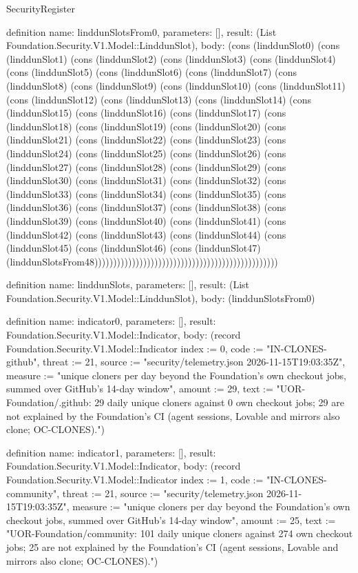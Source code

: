 \begin{lexlean}{SecurityRegister}
\begin{semanticmodule}
definition{
  name: linddunSlotsFrom0,
  parameters: [],
  result: (List Foundation.Security.V1.Model::LinddunSlot),
  body: (cons (linddunSlot0) (cons (linddunSlot1) (cons (linddunSlot2) (cons (linddunSlot3) (cons (linddunSlot4) (cons (linddunSlot5) (cons (linddunSlot6) (cons (linddunSlot7) (cons (linddunSlot8) (cons (linddunSlot9) (cons (linddunSlot10) (cons (linddunSlot11) (cons (linddunSlot12) (cons (linddunSlot13) (cons (linddunSlot14) (cons (linddunSlot15) (cons (linddunSlot16) (cons (linddunSlot17) (cons (linddunSlot18) (cons (linddunSlot19) (cons (linddunSlot20) (cons (linddunSlot21) (cons (linddunSlot22) (cons (linddunSlot23) (cons (linddunSlot24) (cons (linddunSlot25) (cons (linddunSlot26) (cons (linddunSlot27) (cons (linddunSlot28) (cons (linddunSlot29) (cons (linddunSlot30) (cons (linddunSlot31) (cons (linddunSlot32) (cons (linddunSlot33) (cons (linddunSlot34) (cons (linddunSlot35) (cons (linddunSlot36) (cons (linddunSlot37) (cons (linddunSlot38) (cons (linddunSlot39) (cons (linddunSlot40) (cons (linddunSlot41) (cons (linddunSlot42) (cons (linddunSlot43) (cons (linddunSlot44) (cons (linddunSlot45) (cons (linddunSlot46) (cons (linddunSlot47) (linddunSlotsFrom48)))))))))))))))))))))))))))))))))))))))))))))))))
}

definition{
  name: linddunSlots,
  parameters: [],
  result: (List Foundation.Security.V1.Model::LinddunSlot),
  body: (linddunSlotsFrom0)
}

definition{
  name: indicator0,
  parameters: [],
  result: Foundation.Security.V1.Model::Indicator,
  body: (record Foundation.Security.V1.Model::Indicator {index := 0, code := "IN-CLONES-github", threat := 21, source := "security/telemetry.json 2026-11-15T19:03:35Z", measure := "unique cloners per day beyond the Foundation's own checkout jobs, summed over GitHub's 14-day window", amount := 29, text := "UOR-Foundation/.github: 29 daily unique cloners against 0 own checkout jobs; 29 are not explained by the Foundation's CI (agent sessions, Lovable and mirrors also clone; OC-CLONES)."})
}

definition{
  name: indicator1,
  parameters: [],
  result: Foundation.Security.V1.Model::Indicator,
  body: (record Foundation.Security.V1.Model::Indicator {index := 1, code := "IN-CLONES-community", threat := 21, source := "security/telemetry.json 2026-11-15T19:03:35Z", measure := "unique cloners per day beyond the Foundation's own checkout jobs, summed over GitHub's 14-day window", amount := 25, text := "UOR-Foundation/community: 101 daily unique cloners against 274 own checkout jobs; 25 are not explained by the Foundation's CI (agent sessions, Lovable and mirrors also clone; OC-CLONES)."})
}


\end{semanticmodule}
\end{lexlean}
